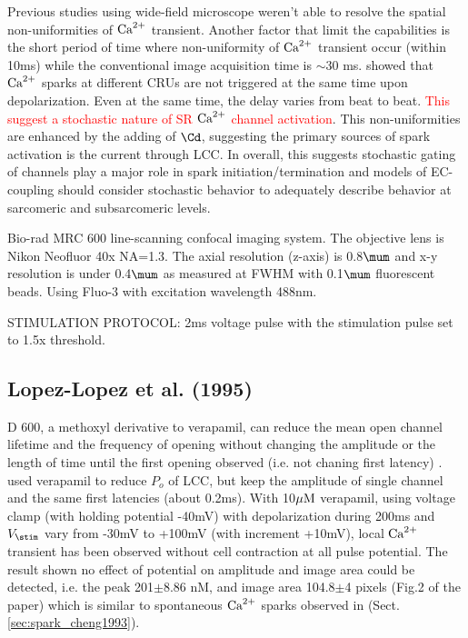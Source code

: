 Previous studies using wide-field microscope weren't able to resolve the spatial
non-uniformities of ${\text{Ca}^{2+}}$ transient. Another factor that limit the capabilities
is the short period of time where non-uniformity of ${\text{Ca}^{2+}}$ transient occur
(within 10ms) while the conventional image acquisition time is $\sim 30$ ms.
\citep{cannell1994snu} showed that ${\text{Ca}^{2+}}$ sparks at different CRUs are not
triggered at the same time upon depolarization. Even at the same time, the delay
varies from beat to beat. \textcolor{red}{This suggest a stochastic nature of SR
${\text{Ca}^{2+}}$ channel activation}. This non-uniformities are enhanced by the adding of
$\Cd$, suggesting the primary sources of spark activation is the current through
LCC.
In overall, this suggests stochastic gating of channels play a major role in
spark initiation/termination and models of EC-coupling should consider
stochastic behavior to adequately describe behavior at sarcomeric and
subsarcomeric levels.

Bio-rad MRC 600 line-scanning confocal imaging system. The objective lens is
Nikon Neofluor 40x NA=1.3. The axial resolution (z-axis) is 0.8$\mum$ and x-y
resolution is under 0.4$\mum$ as measured at FWHM with 0.1$\mum$ fluorescent
beads. Using Fluo-3 with excitation wavelength 488nm. 

STIMULATION PROTOCOL: 2ms voltage pulse with the stimulation pulse set to 1.5x
threshold. 

\subsection{Lopez-Lopez et al. (1995)}
\label{sec:lopez-lopez-et}

D 600, a methoxyl derivative to verapamil, can reduce the mean open channel
lifetime and the frequency of opening without changing the amplitude or the
length of time until the first opening observed (i.e. not chaning first latency)
\citep{mcdonald1989}. ~\citep{lopez-lopez1995} used verapamil to reduce $P_o$ of
LCC, but keep the amplitude of single channel and the same first latencies
(about 0.2ms).
With 10${\mu\text{M}}$ verapamil, using voltage clamp (with holding potential -40mV) with
depolarization during 200ms and $V_\stim$ vary from -30mV to +100mV (with
increment +10mV), local ${\text{Ca}^{2+}}$ transient has been observed without cell
contraction at all pulse potential. The result shown no effect of potential on
amplitude and image area could be detected, i.e. the peak 201$\pm$8.86 nM, and
image area 104.8$\pm$4 pixels (Fig.2 of the paper) which is similar to
spontaneous ${\text{Ca}^{2+}}$ sparks observed in \citep{cheng1993cse}
(Sect.\ref{sec:spark_cheng1993}).

